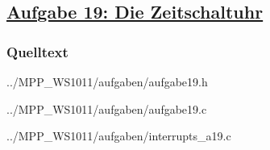 \subsection
{\href{http://cst.mi.fu-berlin.de/intern/19606-P-MPP/Aufgaben/040603.html}
{Aufgabe 19: Die Zeitschaltuhr}}

\subsubsection*{Quelltext}

{../MPP_WS1011/aufgaben/aufgabe19.h}


{../MPP_WS1011/aufgaben/aufgabe19.c}


{../MPP_WS1011/aufgaben/interrupts_a19.c}
